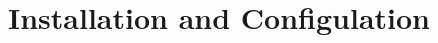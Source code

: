 \newpage\sloppy
\setlength{\RaggedRightRightskip}{0pt plus 2em}
\section{Installation and Configulation}

\fussy

